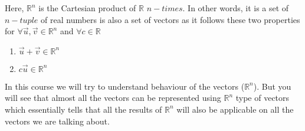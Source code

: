\documentclass{article}
\begin{document}
Here, $\mathbb{R}^n$ is the Cartesian product of $\mathbb{R}$ $n-times$. In other words, it is a set of $n-tuple$ of real numbers is also a set of vectors as it follows these two properties for $\forall\overrightarrow{u},\overrightarrow{v} \in \mathbb{R}^n$ and $\forall c \in \mathbb{R} $
    \begin{enumerate}
        \item $\overrightarrow{u}+\overrightarrow{v} \in \mathbb{R}^n$ 
        \item $c \overrightarrow{u}\in \mathbb{R}^n$
    \end{enumerate}
In this course we will try to understand behaviour of the vectors ($\mathbb{R}^n$). But you will see that almost all the vectors can be represented using $\mathbb{R}^n$ type of vectors which essentially tells that all the results of $\mathbb{R}^n$ will also be applicable on all the vectors we are talking about.
\end{document}
